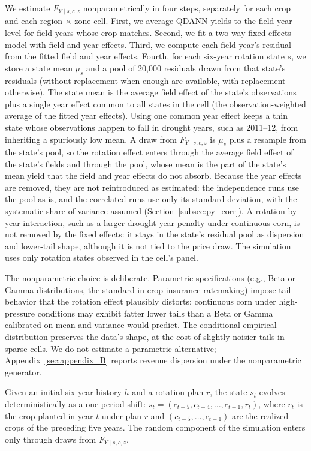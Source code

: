 \documentclass[11pt,letterpaper]{article}
\theoremstyle{remark}
\begin{document}
We estimate $F_{Y \mid s, c, z}$ nonparametrically in four steps, separately for each crop and each region $\times$ zone cell. First, we average QDANN yields to the field-year level for field-years whose crop matches. Second, we fit a two-way fixed-effects model with field and year effects. Third, we compute each field-year's residual from the fitted field and year effects. Fourth, for each six-year rotation state $s$, we store a state mean $\mu_s$ and a pool of 20,000 residuals drawn from that state's residuals (without replacement when enough are available, with replacement otherwise). The state mean is the average field effect of the state's observations plus a single year effect common to all states in the cell (the observation-weighted average of the fitted year effects). Using one common year effect keeps a thin state whose observations happen to fall in drought years, such as 2011--12, from inheriting a spuriously low mean. A draw from $F_{Y \mid s, c, z}$ is $\mu_s$ plus a resample from the state's pool, so the rotation effect enters through the average field effect of the state's fields and through the pool, whose mean is the part of the state's mean yield that the field and year effects do not absorb. Because the year effects are removed, they are not reintroduced as estimated: the independence runs use the pool as is, and the correlated runs use only its standard deviation, with the systematic share of variance assumed (Section~\ref{subsec:py_corr}). A rotation-by-year interaction, such as a larger drought-year penalty under continuous corn, is not removed by the fixed effects: it stays in the state's residual pool as dispersion and lower-tail shape, although it is not tied to the price draw. The simulation uses only rotation states observed in the cell's panel.
 
The nonparametric choice is deliberate. Parametric specifications (e.g., Beta or Gamma distributions, the standard in crop-insurance ratemaking) impose tail behavior that the rotation effect plausibly distorts: continuous corn under high-pressure conditions may exhibit fatter lower tails than a Beta or Gamma calibrated on mean and variance would predict. The conditional empirical distribution preserves the data's shape, at the cost of slightly noisier tails in sparse cells. We do not estimate a parametric alternative; Appendix~\ref{sec:appendix_B} reports revenue dispersion under the nonparametric generator.
 
Given an initial six-year history $h$ and a rotation plan $r$, the state $s_t$ evolves deterministically as a one-period shift: $s_{t} = (c_{t-5}, c_{t-4}, \ldots, c_{t-1}, r_t)$, where $r_t$ is the crop planted in year $t$ under plan $r$ and $(c_{t-5}, \ldots, c_{t-1})$ are the realized crops of the preceding five years. The random component of the simulation enters only through draws from $F_{Y \mid s, c, z}$.
 
\end{document}
